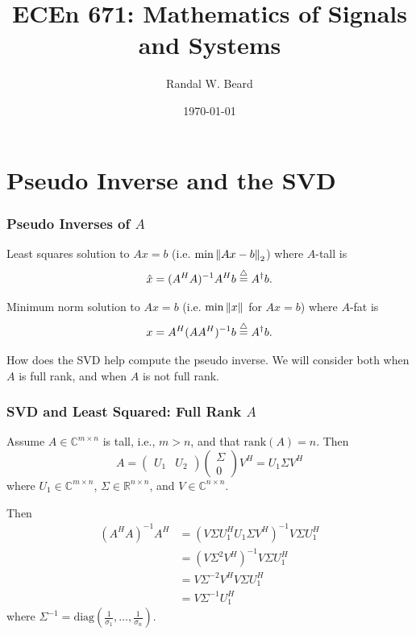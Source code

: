 \documentclass{beamer}
\title{ECEn 671: Mathematics of Signals and Systems}
\author{Randal W. Beard}
\institute{Brigham Young University}
\date{\today}
\begin{document}
\begin{frame}
	\titlepage
\end{frame}


\section{Pseudo Inverse and the SVD}
\frame{\sectionpage}

\begin{frame}\frametitle{Pseudo Inverses of $A$}
	Least squares solution to $Ax=b$ (i.e. $\min\left\|Ax-b\right\|_2$) where $A$-tall is
	\[ 
		\hat{x} = (A^H A)^{-1} A^H b \stackrel{\triangle}{=} A^\dagger b.
	\]
	
	\vfill
	
	Minimum norm solution to $Ax = b$ (i.e. $\min\left\|x\right\|$ for $Ax=b$) where $A$-fat is
	\[
		x = A^H (A A^H)^{-1} b \stackrel{\triangle}{=} A^\dagger b. 
	\]
	
	\vfill
	
	How does the SVD help compute the pseudo inverse.  We will consider both when $A$ is full rank, and when $A$ is not full rank.
\end{frame}

\begin{frame}\frametitle{SVD and Least Squared: Full Rank $A$}
	Assume $A\in\mathbb{C}^{m\times n}$ is tall, i.e.,  $m > n$, and that 
	$\text{rank}(A) = n$.  Then
	\[
		A = 
			\begin{pmatrix}
				U_1 & U_2	
			\end{pmatrix}
			\begin{pmatrix}
				\Sigma \\ 0	
			\end{pmatrix}
			V^H
		= U_1 \Sigma V^H
	\]
	where $U_1\in\mathbb{C}^{m\times n}$, $\Sigma \in \mathbb{R}^{n\times n}$, and $V\in\mathbb{C}^{n\times n}$.
	
	\vfill
	
	Then
	\begin{align*}
		(A^HA)^{-1}A^H 
			&= (V\Sigma U_1^HU_1\Sigma V^H)^{-1}V\Sigma U_1^H\\
			&= (V\Sigma^2V^H)^{-1}V\Sigma U_1^H\\
			&= V\Sigma^{-2}V^HV\Sigma U_1^H\\
			&= V\Sigma^{-1}U_1^H
	\end{align*}
	where $\Sigma^{-1} = \text{diag}(\frac{1}{\sigma_1}, \dots, \frac{1}{\sigma_n})$.	
\end{frame}
\end{document}
